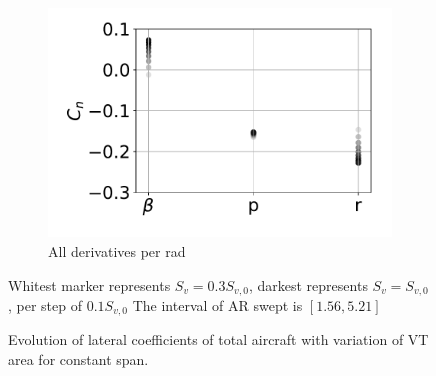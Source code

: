 \begin{figure}[hbt!]
\begin{subfigure}[b]{0.33\textwidth}
		\includegraphics[width=1.0\textwidth]{CnCstSpan}
		\caption{All derivatives per rad}
		\label{fig:CnCstSpan}
	\end{subfigure}
	\caption{Evolution of lateral coefficients of total aircraft with variation of VT area for constant span.} Whitest marker represents $S_v=0.3S_{v,0}$, darkest represents $S_v=S_{v,0}$, per step of $0.1S_{v,0}$ The interval of AR swept is $[1.56,5.21]$\label{fig:cstSpan}
\end{figure}


